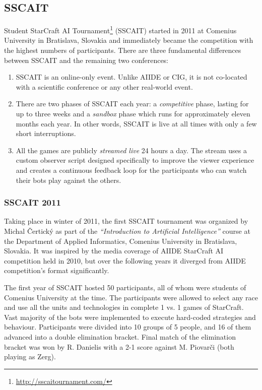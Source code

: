 \documentclass{llncs}
\begin{document}
\subsection{SSCAIT}\label{sec:SSCAIT}
Student StarCraft AI Tournament\footnote{\url{http://sscaitournament.com/}} (SSCAIT) started in 2011 at Comenius University in Bratislava, Slovakia and immediately became the competition with the highest numbers of participants.
There are three fundamental differences between SSCAIT and the remaining two conferences:
\begin{enumerate}
  \item SSCAIT is an online-only event. Unlike AIIDE or CIG, it is not co-located with a scientific conference or any other real-world event.
  \item There are two phases of SSCAIT each year: a {\em competitive} phase, lasting for up to three weeks and a {\em sandbox} phase which runs for approximately eleven months each year. In other words, SSCAIT is live at all times with only a few short interruptions.
  \item All the games are publicly {\em streamed live} 24 hours a day. The stream uses a custom observer script \cite{mattsson2015automatic} designed specifically to improve the viewer experience and creates a continuous feedback loop for the participants who can watch their bots play against the others.
\end{enumerate}

\subsubsection{SSCAIT 2011}
Taking place in winter of 2011, the first SSCAIT tournament was organized by Michal \v{C}ertick\'{y} as part of the {\em ``Introduction to Artificial Intelligence''} course at the Department of Applied Informatics, Comenius University in Bratislava, Slovakia. It was inspired by the media coverage of AIIDE StarCraft AI competition held in 2010, but over the following years it diverged from AIIDE competition's format significantly.

The first year of SSCAIT hosted 50 participants, all of whom were students of Comenius University at the time. The participants were allowed to select any race and use all the units and technologies in complete 1 vs. 1 games of StarCraft. Vast majority of the bots were implemented to execute hard-coded strategies and behaviour. Participants were divided into 10 groups of 5 people, and 16 of them advanced into a double elimination bracket. Final match of the elimination bracket was won by R. Danielis with a 2-1 score against M. Piovar\v{c}i (both playing as Zerg).
\end{document}
